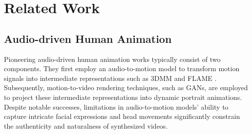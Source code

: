 \documentclass{article}
\begin{document}




\section{Related Work}

\subsection{Audio-driven Human Animation}


Pioneering audio-driven human animation works \cite{guan2023stylesync,zhang2023sadtalker,cheng2022videoretalking,pang2023dpe,yin2022styleheat,gong2023toontalker,wang2024v} typically consist of two components. They first employ an audio-to-motion model to transform motion signals into intermediate representations such as 3DMM \cite{tran2018nonlinear} and FLAME \cite{song2022audio}. Subsequently, motion-to-video rendering techniques, such as GANs, are employed to project these intermediate representations into dynamic portrait animations. Despite notable successes, limitations in audio-to-motion models' ability to capture intricate facial expressions and head movements significantly constrain the authenticity and naturalness of synthesized videos.
\end{document}
